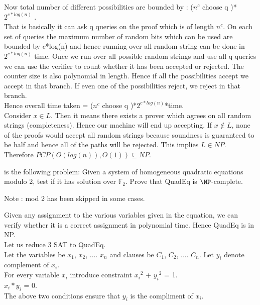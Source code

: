\documentclass[12pt]{exam}
\begin{document}
\begin{questions}
\begin{solution}
Now total number of different possibilities are bounded by : (${n^c}$ choose q )*$2^{c*log(n)}$
.\\
That is basically it can ask q queries on the proof which is of length $n^c$.
On each set of queries the maximum number of random bits which can be used are bounded
by c*log(n) and hence running over all random string can be done in $2^{c*log(n)}$ time.
Once we run over all possible random strings and use all q queries we can use the verifier
to count whether it has been accepted or rejected. The counter size is also polynomial
in length. Hence if all the possibilities accept we accept in that branch. If even one
of the possibilities reject, we reject in that branch.\\

Hence overall time taken = (${n^c}$ choose q )*$2^{c*log(n)}$*time.\\

Consider $x \in L$. Then it means there exists a prover which agrees on all
random strings (completeness). Hence our machine will end up accepting.
If $x \not \in L$, none of the proofs would accept all random strings
because soundness is guaranteed to be half and hence all of the paths
will be rejected. This implies $L \in NP$.\\

Therefore $PCP(O(log(n)), O(1)) \subseteq NP$.\\
\end{solution}
 is the following problem: Given a system of homogeneous quadratic equations modulo 2, test if it has
solution over $\mathbb{F}_2$. Prove that {\sc QuadEq} is $\NP$-complete.
\begin{solution}
Note : mod 2 has been skipped in some cases.

Given any assignment to the various variables
given in the equation, we can verify whether it is a correct assignment
in polynomial time. Hence QuadEq is in NP.\\


Let us reduce 3 SAT to QuadEq.\\
Let the variables be $x_1$, $x_2$, .... $x_n$ and clauses
be $C_1$, $C_2$, .... $C_n$. Let $y_i$ denote complement of $x_i$.\\
For every variable $x_i$ introduce constraint
${x_i}^2$ + ${y_i}^2$ = 1.\\
$x_i*y_i$ = 0.\\
The above two conditions ensure that $y_i$ is the compliment of
$x_i$.\\


\end{solution}
\end{questions}
\end{document}
